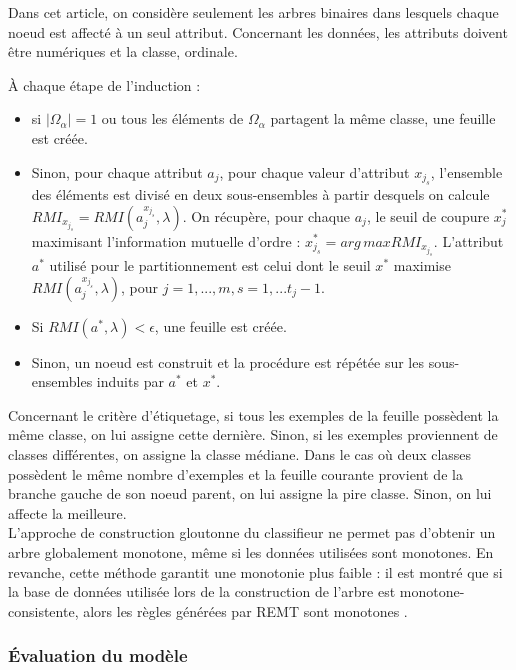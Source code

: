 \documentclass[a4paper]{article}
\begin{document}
Dans cet article, on considère seulement les arbres binaires dans lesquels
chaque noeud est affecté à un seul attribut. Concernant les données, les
attributs doivent être numériques et la classe, ordinale.

\noindent À chaque étape de l'induction :
\begin{itemize}
    \item si $|\Omega_{\alpha}| = 1$ ou tous les éléments
de $\Omega_{\alpha}$ partagent la même classe, une feuille est créée. 
    \item Sinon, pour chaque attribut $a_j$, pour chaque valeur d'attribut $x_{j_s}$, l'ensemble
des éléments est divisé en deux sous-ensembles à partir desquels on calcule
$RMI_{x_{j_s}} = RMI(a^{x_{j_s}}_j, \lambda)$. On récupère, pour chaque $a_j$,
le seuil de coupure $x^*_j$ maximisant l'information mutuelle d'ordre :
$x^*_{j_s} = arg\,max RMI_{x_{j_s}}.$ L'attribut $a^*$ utilisé pour le
partitionnement est celui dont le seuil $x^*$ maximise
$RMI(a^{x_{j_s}}_j,\lambda)$, pour $j=1,...,m, s=1,...t_j-1.$ 
    \item Si $RMI(a^*,
\lambda) < \epsilon$, une feuille est créée. 
    \item Sinon, un noeud est construit et la
procédure est répétée sur les sous-ensembles induits par $a^*$ et $x^*$.
\end{itemize}

Concernant le critère d'étiquetage, si tous les exemples de la feuille possèdent
la même classe, on lui assigne cette dernière. Sinon, si les exemples
proviennent de classes différentes, on assigne la classe médiane. Dans le cas où
deux classes possèdent le même nombre d'exemples et la feuille courante provient
de la branche gauche de son noeud parent, on lui assigne la pire classe. Sinon,
on lui affecte la meilleure.  \\

L'approche de construction gloutonne du classifieur ne permet pas d'obtenir un
arbre globalement monotone, même si les données utilisées sont monotones. En
revanche, cette méthode garantit une monotonie plus faible : il est montré que
si la base de données utilisée lors de la construction de l'arbre est
monotone-consistente, alors les règles générées par REMT sont monotones
\cite{hu-rank}. \\

\subsubsection{Évaluation du modèle}
\end{document}
